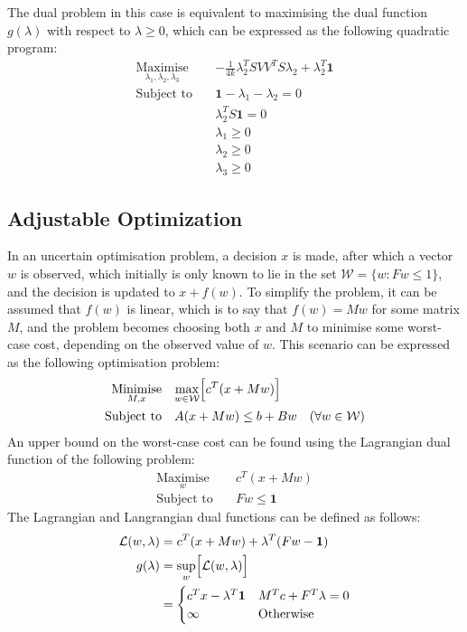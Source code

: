 The dual problem in this case is equivalent to maximising the dual function $g(\lambda)$ with respect to $\lambda\ge0$, which can be expressed as the following quadratic program:
\begin{align*}
    \underset{\lambda_1, \lambda_2, \lambda_3}{\text{Maximise}} \quad & -\frac{1}{4k}\lambda_2^TSVV^TS\lambda_2 + \lambda_2^T\mathbf{1} \\
    \text{Subject to} \quad & \mathbf{1} - \lambda_1 - \lambda_2 = 0 \\
    & \lambda_2^TS\mathbf{1} = 0 \\
    & \lambda_1 \ge 0 \\
    & \lambda_2 \ge 0 \\
    & \lambda_3 \ge 0
\end{align*}

\subsection{Adjustable Optimization}
In an uncertain optimisation problem, a decision $x$ is made, after which a vector $w$ is observed, which initially is only known to lie in the set $\mathcal{W} = \{ w: Fw \le 1 \}$, and the decision is updated to $x + f(w)$. To simplify the problem, it can be assumed that $f(w)$ is linear, which is to say that $f(w) = Mw$ for some matrix $M$, and the problem becomes choosing both $x$ and $M$ to minimise some worst-case cost, depending on the observed value of $w$. This scenario can be expressed as the following optimisation problem:
\begin{align*}
    \underset{M, x}{\text{Minimise}} \quad & \underset{w\in\mathcal{W}}{\max}\Bigl[ c^T(x + Mw) \Bigr] \\
    \text{Subject to} \quad & A(x + Mw) \le b + Bw \quad (\forall w\in\mathcal{W})
\end{align*}
An upper bound on the worst-case cost can be found using the Lagrangian dual function of the following problem:
\begin{align*}
    \underset{w}{\text{Maximise}} \quad & c^T(x + Mw) \\
    \text{Subject to} \quad & Fw \le \mathbf{1}
\end{align*}
The Lagrangian and Langrangian dual functions can be defined as follows:
\begin{align*}
    \mathcal{L}(w, \lambda) &= c^T(x + Mw) + \lambda^T(Fw - \mathbf{1}) \\
    g(\lambda) &= \underset{w}{\sup}\Bigl[\mathcal{L}(w, \lambda)\Bigr] \\
    &= \begin{cases}
        c^Tx - \lambda^T\mathbf{1} & M^Tc + F^T\lambda = 0 \\
        \infty & \text{Otherwise}
    \end{cases}
\end{align*}
